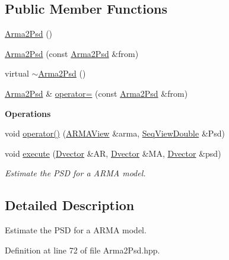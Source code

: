 \subsection*{Public Member Functions}
\begin{DoxyCompactItemize}
\item 
\hyperlink{classtsa_1_1_arma2_psd_a3488311932cc240d99a8e40c124da91d}{Arma2\+Psd} ()
\item 
\hyperlink{classtsa_1_1_arma2_psd_aa3a79a62709efcfdbb3268cf253837e1}{Arma2\+Psd} (const \hyperlink{classtsa_1_1_arma2_psd}{Arma2\+Psd} \&from)
\item 
virtual \hyperlink{classtsa_1_1_arma2_psd_aef3535e694289be52365ded1f83b7599}{$\sim$\+Arma2\+Psd} ()
\item 
\hyperlink{classtsa_1_1_arma2_psd}{Arma2\+Psd} \& \hyperlink{classtsa_1_1_arma2_psd_a85b4577ccb8331c63c004eb2e917b59b}{operator=} (const \hyperlink{classtsa_1_1_arma2_psd}{Arma2\+Psd} \&from)
\end{DoxyCompactItemize}
\begin{Indent}\textbf{ Operations}\par
\begin{DoxyCompactItemize}
\item 
void \hyperlink{classtsa_1_1_arma2_psd_a345f2bf999cad8a585d7fff389bbefa4}{operator()} (\hyperlink{classtsa_1_1_a_r_m_a_view}{A\+R\+M\+A\+View} \&arma, \hyperlink{namespacetsa_ac599574bcc094eda25613724b8f3ca9e}{Seq\+View\+Double} \&Psd)
\item 
void \hyperlink{classtsa_1_1_arma2_psd_afb147e11ba8e3ddef347fdf121cac5e1}{execute} (\hyperlink{namespacetsa_a8900fb03d849baf447a1a0efe2561fb2}{Dvector} \&AR, \hyperlink{namespacetsa_a8900fb03d849baf447a1a0efe2561fb2}{Dvector} \&MA, \hyperlink{namespacetsa_a8900fb03d849baf447a1a0efe2561fb2}{Dvector} \&psd)
\begin{DoxyCompactList}\small\item\em Estimate the P\+SD for a A\+R\+MA model. \end{DoxyCompactList}\end{DoxyCompactItemize}
\end{Indent}


\subsection{Detailed Description}
Estimate the P\+SD for a A\+R\+MA model. 

Definition at line 72 of file Arma2\+Psd.\+hpp.



